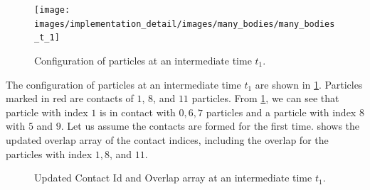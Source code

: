 \begin{figure}[!htpb]
  \centering
  \texttt{[image: images/implementation\_detail/images/many\_bodies/many\_bodies\_t\_1]}
  \caption{Configuration of particles at an intermediate time $t_1$.}
\label{fig:id:15_particle_t_1}
\end{figure}
%
The configuration of particles at an intermediate time $t_1$ are shown in
\cref{fig:id:15_particle_t_1}. Particles marked in red are contacts of $1$, $8$,
and $11$ particles. From \cref{fig:id:15_particle_t_1}, we can see that
particle with index $1$ is in contact with $0, 6, 7$ particles and a particle
with index $8$ with $5$ and $9$. Let us assume the contacts are formed for the
first time.  shows the
updated overlap array of the contact indices, including the overlap for the
particles with index $1, 8$, and $11$.
\begin{figure}[!htpb]
  \centering
  \footnotesize
  \caption{Updated Contact Id and Overlap array at an intermediate time $t_1$.}
\label{fig:many_bodies_initialize_overlap_1_8_11_t_1}
\end{figure}


